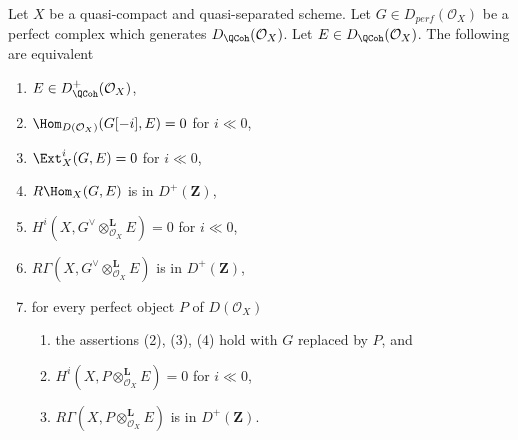 \begin{proposition}
\label{proposition-detecting-bounded-below}
Let $X$ be a quasi-compact and quasi-separated scheme.
Let $G \in D_{perf}(\mathcal{O}_X)$
be a perfect complex which generates $D_\QCoh (\mathcal{O}_X)$. Let
$E \in D_\QCoh (\mathcal{O}_X)$. The following are equivalent
\begin{enumerate}
\item $E \in D^+_\QCoh (\mathcal{O}_X)$,
\item $\Hom_{D(\mathcal{O}_X)}(G[-i], E) = 0$ for $i \ll 0$,
\item $\Ext^i_X(G, E) = 0$ for $i \ll 0$,
\item $R\Hom_X(G, E)$ is in $D^+(\mathbf{Z})$,
\item $H^i(X, G^\vee \otimes_{\mathcal{O}_X}^\mathbf{L} E) = 0$
for $i \ll 0$,
\item $R\Gamma(X, G^\vee \otimes_{\mathcal{O}_X}^\mathbf{L} E)$
is in $D^+(\mathbf{Z})$,
\item for every perfect object $P$ of $D(\mathcal{O}_X)$
\begin{enumerate}
\item the assertions (2), (3), (4) hold with $G$ replaced by $P$, and
\item $H^i(X, P \otimes_{\mathcal{O}_X}^\mathbf{L} E) = 0$ for $i \ll 0$,
\item $R\Gamma(X, P \otimes_{\mathcal{O}_X}^\mathbf{L} E)$
is in $D^+(\mathbf{Z})$.
\end{enumerate}
\end{enumerate}
\end{proposition}

